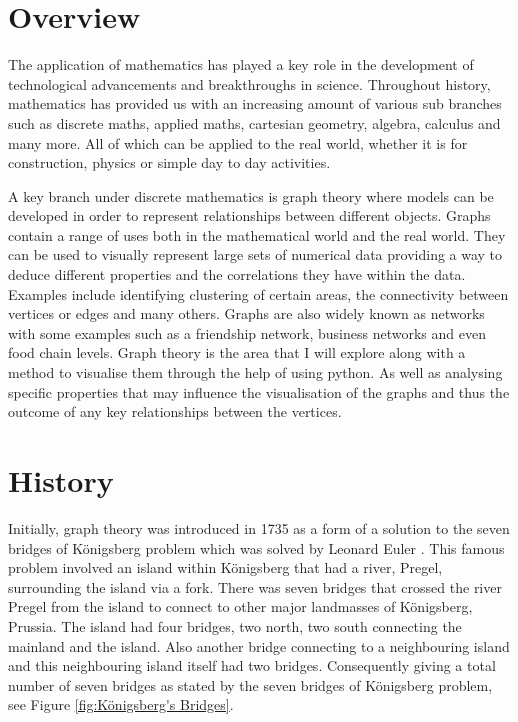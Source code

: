\section{Overview}
The application of mathematics has played a key role in the development of technological advancements and breakthroughs in science. Throughout history, mathematics has provided us with an increasing amount of various sub branches such as discrete maths, applied maths, cartesian geometry, algebra, calculus and many more. All of which can be applied to the real world, whether it is for construction, physics or simple day to day activities. 

A key branch under discrete mathematics is graph theory where models can be developed in order to represent relationships between different objects. Graphs contain a range of uses both in the mathematical world and the real world. They can be used to visually represent large sets of numerical data providing a way to deduce different properties and the correlations they have within the data. Examples include identifying clustering of certain areas, the connectivity between vertices or edges and many others. Graphs are also widely known as networks with some examples such as a friendship network, business networks and even food chain levels. Graph theory is the area that I will explore along with a method to visualise them through the help of using python. As well as analysing specific properties that may influence the visualisation of the graphs and thus the outcome of any key relationships between the vertices.

\section{History}
Initially, graph theory was introduced in 1735 as a form of a solution to the seven bridges of Königsberg problem which was solved by Leonard Euler \cite{POWELL20151}. This famous problem involved an island within Königsberg that had a river, Pregel, surrounding the island via a fork. There was seven bridges that crossed the river Pregel from the island to connect to other major landmasses of Königsberg, Prussia. The island had four bridges, two north, two south connecting the mainland and the island. Also another bridge connecting to a neighbouring island and this neighbouring island itself had two bridges. Consequently giving a total number of seven bridges as stated by the seven bridges of Königsberg problem, see Figure \ref{fig:Königsberg's Bridges}. 

